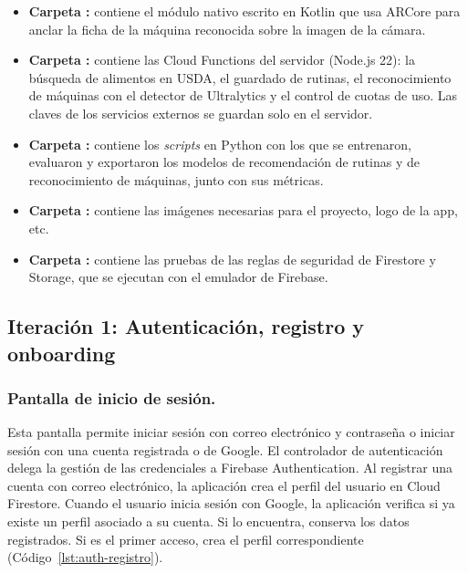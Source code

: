 \begin{itemize}
    (Zustand).
    \item \textbf{Carpeta :} contiene el módulo
    nativo escrito en Kotlin que usa ARCore para anclar la ficha de la máquina
    reconocida sobre la imagen de la cámara.
    \item \textbf{Carpeta :} contiene las Cloud Functions
    del servidor (Node.js 22): la búsqueda de alimentos en USDA, el guardado
    de rutinas, el reconocimiento de máquinas con el detector de Ultralytics y
    el control de cuotas de uso. Las claves de los servicios externos se
    guardan solo en el servidor.
    \item \textbf{Carpeta :} contiene los \emph{scripts} en
    Python con los que se entrenaron, evaluaron y exportaron los modelos de
    recomendación de rutinas y de reconocimiento de máquinas, junto con sus
    métricas.
    \item \textbf{Carpeta :} contiene las imágenes necesarias 
    para el proyecto, logo de la app, etc.
    \item \textbf{Carpeta :} contiene las pruebas de
    las reglas de seguridad de Firestore y Storage, que se ejecutan con el
    emulador de Firebase.
\end{itemize}

\subsection{Iteración 1: Autenticación, registro y onboarding}
\label{subsec:it1}

\subsubsection{Pantalla de inicio de sesión.}

Esta pantalla permite iniciar sesión con correo electrónico y contraseña
o iniciar sesión con una cuenta registrada o de Google. El controlador de
autenticación delega la gestión de las credenciales a Firebase Authentication.
Al registrar una cuenta con correo electrónico, la aplicación crea el perfil
del usuario en Cloud Firestore. Cuando el usuario inicia sesión con Google,
la aplicación verifica si ya existe un perfil asociado a su cuenta. Si lo
encuentra, conserva los datos registrados. Si es el primer acceso, crea el
perfil correspondiente (Código~\ref{lst:auth-registro}).

